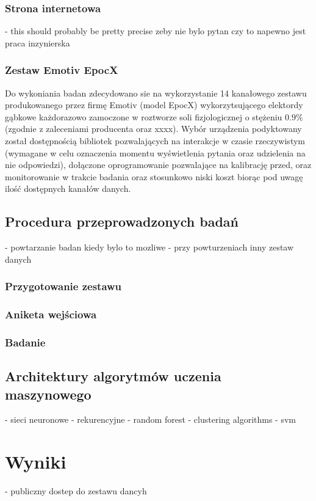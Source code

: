 \documentclass{./assets/wfis}
\begin{document}
\subsection{Strona internetowa}
- this should probably be pretty precise zeby nie bylo pytan czy to napewno jest praca inzynierska
\subsection{Zestaw Emotiv EpocX}\label{emotiv}

Do wykoniania badan zdecydowano sie na wykorzystanie 14 kanałowego zestawu produkowanego przez firmę Emotiv (model EpocX) wykorzytsującego elektordy gąbkowe każdorazowo zamoczone w roztworze soli fizjologicznej o stężeniu $0.9\%$ (zgodnie z zaleceniami producenta \cite{} oraz xxxx). Wybór urządzenia podyktowany został dostępnością bibliotek pozwalających na interakcje w czasie rzeczywistym (wymagane w celu oznaczenia momentu wyświetlenia pytania oraz udzielenia na nie odpowiedzi), dołączone oprogramowanie pozwalające na kalibrację przed, oraz monitorowanie w trakcie badania oraz stosunkowo niski koszt biorąc pod uwagę ilość dostępnych kanałów danych.

\section{Procedura przeprowadzonych badań}\label{procedura-badan}
- powtarzanie badan kiedy bylo to mozliwe
- przy powturzeniach inny zestaw danych
\subsection{Przygotowanie zestawu}
\subsection{Aniketa wejściowa}
\subsection{Badanie}

\section{Architektury algorytmów uczenia maszynowego}
- sieci neuronowe
    - rekurencyjne 
- random forest
- clustering algorithms
- svm

\chapter{Wyniki}
- publiczny dostep do zestawu dancyh
\end{document}
